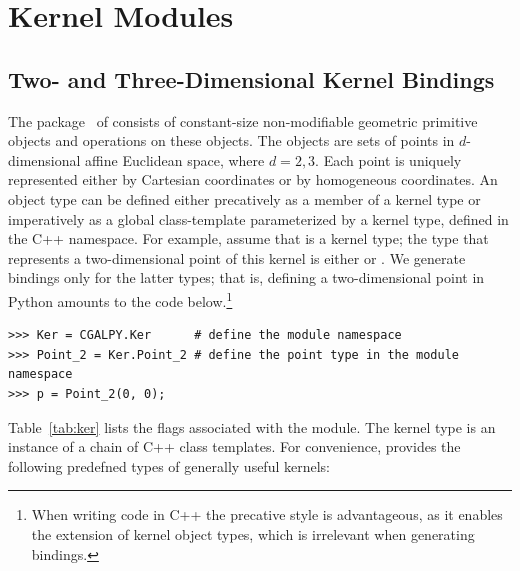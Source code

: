 \section{Kernel Modules}
\label{sec:kernelModules}
\subsection{Two- and Three-Dimensional Kernel Bindings}
\label{ssec:modules:kernel}
The \iiDandiiiDGeometryKernelPackage{}
package~\cite{cgal:bfghhkps-lgk23-21a} of \cgal{} consists of constant-size non-modifiable geometric primitive objects and operations on these objects. The objects are sets of points in
$d$-dimensional affine Euclidean space, where $d = 2,3$.  Each point is uniquely represented either by Cartesian coordinates or by homogeneous coordinates. An object type can be defined either precatively as a member of a kernel type or imperatively as a global class-template parameterized by a kernel type, defined in the C++  namespace. For example, assume that  is a kernel type; the type that represents a two-dimensional point of this kernel is either  or .  We generate bindings only for the latter types; that is, defining a two-dimensional point in Python amounts to the code below.\footnote{When writing code in C++ the precative style is advantageous, as it enables the extension of kernel object types, which is irrelevant when generating bindings.}
\begin{lstlisting}[style=pythonStyle]
>>> Ker = CGALPY.Ker      # define the module namespace
>>> Point_2 = Ker.Point_2 # define the point type in the module namespace
>>> p = Point_2(0, 0);
\end{lstlisting}
Table~\ref{tab:ker} lists the \cmake{} flags associated with the
\iiDandiiiDGeometryKernelPackage{} module.  The kernel type is an
instance of a chain of C++ class templates. For convenience, \cgal{}
provides the following predefned types of generally useful kernels:
